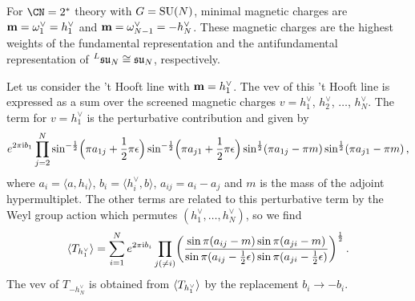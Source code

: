 



For $\CN = 2^*$ theory with $G = \mathrm{SU}(N)$, minimal magnetic charges are
$\mathbf{m} = \omega^\vee_1 = h^\vee_1$ and
$\mathbf{m} = \omega^\vee_{N-1} = -h^\vee_N$.  These magnetic charges are the
highest weights of the fundamental representation and the
antifundamental representation of ${}^L\mathfrak{su}_N \cong \mathfrak{su}_N$,
respectively.

Let us consider the 't Hooft line with $\mathbf{m} = h^\vee_1$.  The vev
of this 't Hooft line is expressed as a sum over the screened magnetic
charges $v = h^\vee_1$, $h^\vee_2$, $\dotsc$, $h^\vee_N$.  The term
for $v = h^\vee_1$ is the perturbative contribution and given by
\begin{equation}
  e^{2\pi\mathrm{i} b_1}
  \prod_{j=2}^N
  \sin^{-\frac12}\Bigl(\pi a_{1j} + \frac12 \pi\epsilon\Bigr)
  \sin^{-\frac12}\Bigl(\pi a_{j1} + \frac12 \pi\epsilon\Bigr)
  \sin^{\frac12}(\pi a_{1j} - \pi m)
  \sin^{\frac12}(\pi a_{j1} - \pi m) \,,
\end{equation}
where $a_i = \langle a, h_i\rangle$,
$b_i = \langle h^\vee_i, b\rangle$, $a_{ij} = a_i - a_j$ and $m$ is
the mass of the adjoint hypermultiplet.  The other terms are related
to this perturbative term by the Weyl group action which permutes
$(h^\vee_1, \dotsc, h^\vee_N)$, so we find
\begin{equation}
  \langle T_{h^\vee_1} \rangle
  =
  \sum_{i=1}^N
  e^{2\pi\mathrm{i} b_i}
  \prod_{j (\neq i)}
  \biggl(
  \frac{\sin\pi(a_{ij} - m) \sin\pi(a_{ji} - m)}
       {\sin\pi(a_{ij} - \frac12\epsilon) \sin\pi(a_{ji} - \frac12\epsilon)}
  \biggr)^{\frac12} \,.
\end{equation}
The vev of $T_{-h^\vee_N}$ is obtained from $\langle T_{h^\vee_1} \rangle$ by
the replacement $b_i \to -b_i$.

